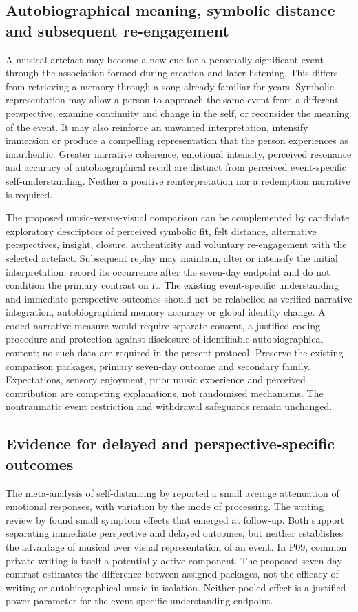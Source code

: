 \documentclass[11pt,a4paper]{article}
\begin{document}
\subsection{Autobiographical meaning, symbolic distance and subsequent re-engagement}
A musical artefact may become a new cue for a personally significant event through the association formed during creation and later listening. This differs from retrieving a memory through a song already familiar for years. Symbolic representation may allow a person to approach the same event from a different perspective, examine continuity and change in the self, or reconsider the meaning of the event. It may also reinforce an unwanted interpretation, intensify immersion or produce a compelling representation that the person experiences as inauthentic. Greater narrative coherence, emotional intensity, perceived resonance and accuracy of autobiographical recall are distinct from perceived event-specific self-understanding. Neither a positive reinterpretation nor a redemption narrative is required.

The proposed music-versus-visual comparison can be complemented by candidate exploratory descriptors of perceived symbolic fit, felt distance, alternative perspectives, insight, closure, authenticity and voluntary re-engagement with the selected artefact. Subsequent replay may maintain, alter or intensify the initial interpretation; record its occurrence after the seven-day endpoint and do not condition the primary contrast on it. The existing event-specific understanding and immediate perspective outcomes should not be relabelled as verified narrative integration, autobiographical memory accuracy or global identity change. A coded narrative measure would require separate consent, a justified coding procedure and protection against disclosure of identifiable autobiographical content; no such data are required in the present protocol. Preserve the existing comparison packages, primary seven-day outcome and secondary family. Expectations, sensory enjoyment, prior music experience and perceived contribution are competing explanations, not randomised mechanisms. The nontraumatic event restriction and withdrawal safeguards remain unchanged.

\subsection{Evidence for delayed and perspective-specific outcomes}
The meta-analysis of self-distancing by \citet{guodistance2022} reported a small average attenuation of emotional responses, with variation by the mode of processing. The writing review by \citet{guowriting2023} found small symptom effects that emerged at follow-up. Both support separating immediate perspective and delayed outcomes, but neither establishes the advantage of musical over visual representation of an event. In P09, common private writing is itself a potentially active component. The proposed seven-day contrast estimates the difference between assigned packages, not the efficacy of writing or autobiographical music in isolation. Neither pooled effect is a justified power parameter for the event-specific understanding endpoint.
\end{document}
